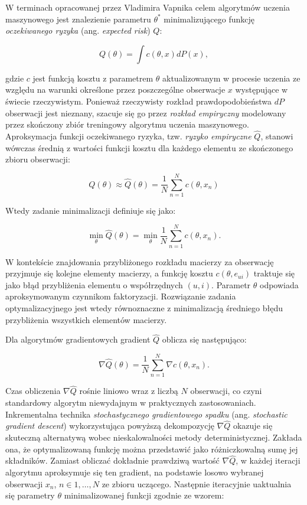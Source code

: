 \documentclass{pracamgr}
\begin{document}
W terminach  opracowanej przez Vladimira Vapnika \cite{Vapnik} celem algorytmów uczenia maszynowego jest znalezienie parametru $\theta^{\ast}$ minimalizującego funkcję \textit{oczekiwanego ryzyka} (ang. \textit{expected risk}) $Q$:

\[
Q(\theta) = \int c(\theta, x)dP(x),
\]

gdzie $c$ jest funkcją kosztu z parametrem $\theta$ aktualizowanym w procesie uczenia ze względu na warunki określone przez poszczególne obserwacje $x$ występujące w świecie rzeczywistym. Ponieważ rzeczywisty rozkład prawdopodobieństwa $dP$ obserwacji jest nieznany, szacuje się go przez \textit{rozkład empiryczny} modelowany przez skończony zbiór treningowy algorytmu uczenia maszynowego. Aproksymacja funkcji oczekiwanego ryzyka, tzw. \textit{ryzyko empiryczne} $\hat{Q}$, stanowi wówczas średnią z wartości funkcji kosztu dla każdego elementu ze skończonego zbioru obserwacji:

\[
Q(\theta) \approx \hat{Q}(\theta) = \frac{1}{N} \sum_{n = 1}^{N} c(\theta, x_n)
\]

Wtedy zadanie minimalizacji definiuje się jako:

\[
\min_{\theta} \hat{Q}(\theta) = \min_{\theta} \frac{1}{N} \sum_{n = 1}^{N} c(\theta, x_n).
\]

W kontekście znajdowania przybliżonego rozkładu macierzy za obserwację przyjmuje się kolejne elementy macierzy,  a funkcję kosztu $c(\theta, e_{ui})$ traktuje się jako błąd przybliżenia elementu o współrzędnych $(u, i)$. Parametr $\theta$ odpowiada aproksymowanym czynnikom faktoryzacji. Rozwiązanie zadania optymalizacyjnego jest wtedy równoznaczne z minimalizacją średniego błędu przybliżenia wszystkich elementów macierzy.

Dla algorytmów gradientowych gradient $\hat{Q}$ oblicza się następująco:

\[
\nabla \hat{Q}(\theta) = \frac{1}{N} \sum_{n = 1}^{N} \nabla c(\theta, x_n).
\]

Czas obliczenia $\nabla \hat{Q}$ rośnie liniowo wraz z liczbą $N$ obserwacji, co czyni standardowy algorytm niewydajnym w praktycznych zastosowaniach. Inkrementalna technika \textit{stochastycznego gradientowego spadku} (ang. \textit{stochastic gradient descent}) wykorzystująca powyższą dekompozycję $\nabla \hat{Q}$ okazuje się skuteczną alternatywą wobec nieskalowalności metody deterministycznej. Zakłada ona, że optymalizowaną funkcję można przedstawić jako różniczkowalną sumę jej składników. Zamiast obliczać dokładnie prawdziwą wartość $\nabla \hat{Q}$, w każdej iteracji algorytmu aproksymuje się ten gradient, na podstawie losowo wybranej obserwacji $x_n$, $n \in {1, \ldots, N}$ ze zbioru uczącego. Następnie iteracyjnie uaktualnia się parametry $\theta$ minimalizowanej funkcji zgodnie ze wzorem:
\end{document}
